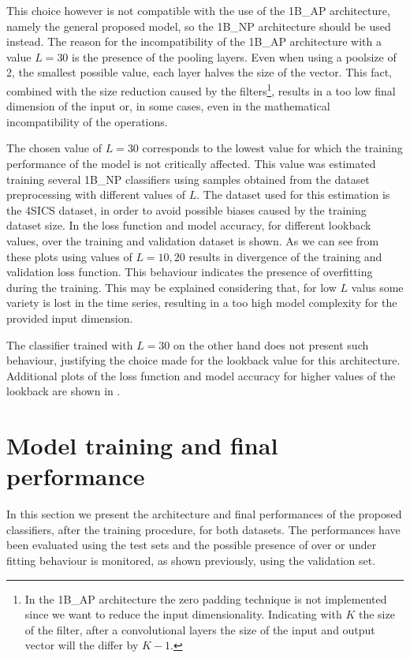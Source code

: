 This choice however is not compatible with the use of the 1B\_AP architecture, namely the general proposed model, so the 1B\_NP architecture should be used instead. The reason for the incompatibility of the 1B\_AP architecture with a value $L=30$ is the presence of the pooling layers. 
Even when using a poolsize of 2, the smallest possible value, each layer halves the size of the vector. This fact, combined with the size reduction caused by the filters\footnote{In the 1B\_AP architecture the zero padding technique is not implemented since we want to reduce the input dimensionality. Indicating with $K$ the size of the filter, after a convolutional layers the size of the input and output vector will the differ by $K-1$.}, results in a too low final dimension of the input or, in some cases, even in the mathematical incompatibility of the operations.

The chosen value of $L=30$ corresponds to the lowest value for which the training performance of the model is not critically affected. This value was estimated training several 1B\_NP classifiers using samples obtained from the dataset preprocessing with different values of $L$. The dataset used for this estimation is the 4SICS dataset, in order to avoid possible biases caused by the training dataset size. 
In  the loss function and model accuracy, for different lookback values, over the training and validation dataset is shown. As we can see from these plots  using values of $L=10,20$ results in divergence of the training and validation loss function. This behaviour indicates the presence of overfitting during the training. This may be explained considering that, for low $L$ valus some variety is lost in the time series, resulting in a too high model complexity for the provided input dimension.

The classifier trained with $L=30$ on the other hand does not present such behaviour, justifying the choice made for the lookback value for this architecture. Additional plots of the loss function and model accuracy for higher values of the lookback are shown in .





\section{Model training and final performance}\label{res_test}

In this section we present the architecture and final performances of the proposed classifiers, after the training procedure, for both datasets. The performances have been evaluated using the test sets and the possible presence of over or under fitting behaviour is monitored, as shown previously, using the validation set. 

